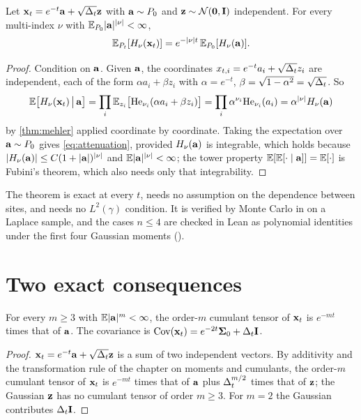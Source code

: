 \begin{theorem}
\label{thm:hermite-attenuation}
Let $\mathbf{x}_t=e^{-t}\mathbf{a}+\sqrt{\Delta_t}\mathbf{z}$ with $\mathbf{a}\sim P_0$ and $\mathbf{z}\sim\mathcal{N}\!\left(\mathbf{0},\mathbf{I}\right)$
independent. For every multi-index $\nu$ with $\mathbb{E}_{P_0}|\mathbf{a}|^{|\nu|}<\infty$,
\begin{equation}
  \mathbb{E}_{P_t}[H_\nu(\mathbf{x}_t)]=e^{-|\nu|t}\,\mathbb{E}_{P_0}[H_\nu(\mathbf{a})].
  \label{eq:attenuation}
\end{equation}
\end{theorem}
\begin{proof}
Condition on $\mathbf{a}$. Given $\mathbf{a}$, the coordinates $x_{t,i}=e^{-t}a_i+\sqrt{\Delta_t}z_i$ are
independent, each of the form $\alpha a_i+\beta z_i$ with $\alpha=e^{-t}$,
$\beta=\sqrt{1-\alpha^2}=\sqrt{\Delta_t}$. So
\[
  \mathbb{E}\bigl[H_\nu(\mathbf{x}_t)\,\big|\,\mathbf{a}\bigr]=\prod_i\mathbb{E}_{z_i}\bigl[\mathrm{He}_{\nu_i}(\alpha a_i+\beta z_i)\bigr]
  =\prod_i\alpha^{\nu_i}\mathrm{He}_{\nu_i}(a_i)=\alpha^{|\nu|}H_\nu(\mathbf{a})
\]
by \cref{thm:mehler} applied coordinate by coordinate. Taking the expectation over
$\mathbf{a}\sim P_0$ gives \cref{eq:attenuation}, provided $H_\nu(\mathbf{a})$ is integrable, which
holds because $|H_\nu(\mathbf{a})|\le C(1+|\mathbf{a}|)^{|\nu|}$ and $\mathbb{E}|\mathbf{a}|^{|\nu|}<\infty$; the
tower property $\mathbb{E}[\mathbb{E}[\cdot\mid\mathbf{a}]]=\mathbb{E}[\cdot]$ is Fubini's theorem, which also needs
only that integrability.
\end{proof}

The theorem is exact at every $t$, needs no assumption on the dependence between
sites, and needs no $L^2(\gamma)$ condition. It is verified by Monte Carlo in
 on a Laplace sample, and the cases $n\le4$ are
checked in Lean as polynomial identities under the first four Gaussian moments
().

\section{Two exact consequences}

\begin{corollary}
\label{cor:cumulant-attenuation}
For every $m\ge3$ with $\mathbb{E}|\mathbf{a}|^m<\infty$, the order-$m$ cumulant tensor of $\mathbf{x}_t$ is
$e^{-mt}$ times that of $\mathbf{a}$. The covariance is $\operatorname{Cov}(\mathbf{x}_t)=e^{-2t}\mathbf{\Sigma}_0+\Delta_t\mathbf{I}$.
\end{corollary}
\begin{proof}
$\mathbf{x}_t=e^{-t}\mathbf{a}+\sqrt{\Delta_t}\mathbf{z}$ is a sum of two independent vectors. By additivity and
the transformation rule of the chapter on moments and cumulants, the order-$m$
cumulant tensor of $\mathbf{x}_t$ is $e^{-mt}$ times that of $\mathbf{a}$ plus $\Delta_t^{m/2}$ times that
of $\mathbf{z}$; the Gaussian $\mathbf{z}$ has no cumulant tensor of order $m\ge3$. For $m=2$ the
Gaussian contributes $\Delta_t\mathbf{I}$.
\end{proof}

